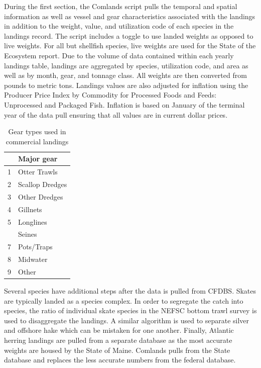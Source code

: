 \documentclass[
]{book}
\begin{document}
During the first section, the Comlands script pulls the temporal and spatial information as well as vessel and gear characteristics associated with the landings in addition to the weight, value, and utilization code of each species in the landings record. The script includes a toggle to use landed weights as opposed to live weights. For all but shellfish species, live weights are used for the State of the Ecosystem report. Due to the volume of data contained within each yearly landings table, landings are aggregated by species, utilization code, and area as well as by month, gear, and tonnage class. All weights are then converted from pounds to metric tons. Landings values are also adjusted for inflation using the Producer Price Index by Commodity for Processed Foods and Feeds: Unprocessed and Packaged Fish. Inflation is based on January of the terminal year of the data pull ensuring that all values are in current dollar prices.

\begin{table}

\caption{\label{tab:geartypes}Gear types used in commercial landings}
\centering
\begin{tabular}[t]{rl}
\toprule
 & Major gear\\
\midrule
1 & Otter Trawls\\
2 & Scallop Dredges\\
3 & Other Dredges\\
4 & Gillnets\\
5 & Longlines\\
\addlinespace
6 & Seines\\
7 & Pots/Traps\\
8 & Midwater\\
9 & Other\\
\bottomrule
\end{tabular}
\end{table}

Several species have additional steps after the data is pulled from CFDBS. Skates are typically landed as a species complex. In order to segregate the catch into species, the ratio of individual skate species in the NEFSC bottom trawl survey is used to disaggregate the landings. A similar algorithm is used to separate silver and offshore hake which can be mistaken for one another. Finally, Atlantic herring landings are pulled from a separate database as the most accurate weights are housed by the State of Maine. Comlands pulls from the State database and replaces the less accurate numbers from the federal database.
\end{document}
